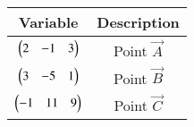 \begin{tabular}[12pt]{ |c| c|}
    \hline
    \textbf{Variable} & \textbf{Description}\\ 
    \hline
	$\begin{pmatrix}2&-1&3\end{pmatrix}$ & Point $\vec{A}$\\
    \hline 
	$\begin{pmatrix}3&-5&1\end{pmatrix}$ & Point $\vec{B}$\\
    \hline
	$\begin{pmatrix}-1&11&9\end{pmatrix}$ & Point $\vec{C}$\\
    \hline   
\end{tabular}
